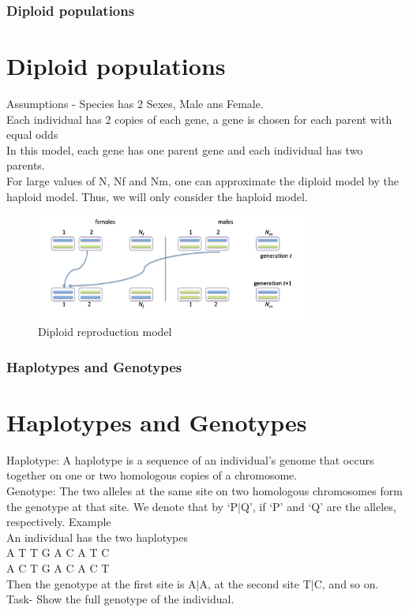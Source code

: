 \documentclass{beamer}
\begin{document}
    \begin{frame}
        \frametitle{Diploid populations}
        \section*{Diploid populations}
        Assumptions - 
        Species has 2 Sexes, Male ans Female. \\
        Each individual has 2 copies of each gene, a gene is chosen for each parent with equal odds \\
        In this model, each gene has one parent gene and each individual has two parents.\\
        For large values of N, Nf and Nm, one can approximate the diploid model by the haploid model.
        Thus, we will only consider the haploid model.\\
        \begin{figure}
            \includegraphics[width=0.8\textwidth]{diploidRep.png}
               \caption{Diploid reproduction model}
           \end{figure}

    
        
    
    \end{frame}
    \begin{frame}
        \frametitle{Haplotypes and Genotypes}
        \section*{Haplotypes and Genotypes}
        Haplotype: A haplotype is a sequence of an individual’s genome that occurs together on one or two homologous copies of a chromosome.\\
        Genotype: The two alleles at the same site on two homologous chromosomes form the genotype at that site. We denote that by ‘P$|$Q’, if ‘P’ and ‘Q’ are the alleles, respectively.
        Example \\
        An individual has the two haplotypes \\
        A T T G A C A T C \\
        A C T G A C A C T \\
        Then the genotype at the first site is A$|$A, at the second site T$|$C, and so on. \\
        Task- Show the full genotype of the individual.
    \end{frame}
\end{document}
